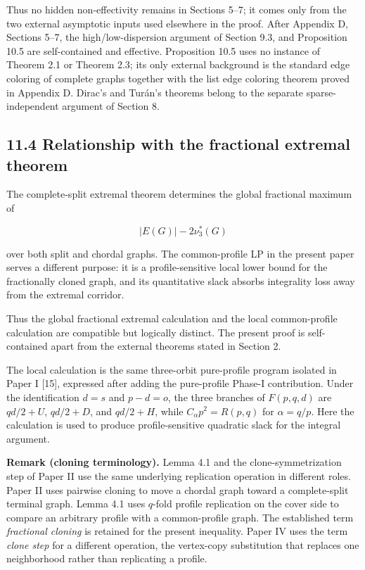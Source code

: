 \documentclass[english,11pt,a4paper]{article}
\begin{document}
Thus no hidden non-effectivity remains in Sections 5--7; it comes only
from the two external asymptotic inputs used elsewhere in the proof.
After Appendix D, Sections 5--7, the high/low-dispersion argument of
Section 9.3, and Proposition 10.5 are self-contained and effective.
Proposition 10.5 uses no instance of Theorem 2.1 or Theorem 2.3; its
only external background is the standard edge coloring of complete
graphs together with the list edge coloring theorem proved in Appendix
D. Dirac's and Turán's theorems belong to the separate
sparse-independent argument of Section 8.

\subsection{11.4 Relationship with the fractional extremal
theorem}\label{relationship-with-the-fractional-extremal-theorem}

The complete-split extremal theorem determines the global fractional
maximum of

\[
|E(G)|-2\nu_3^*(G)
\]

over both split and chordal graphs. The common-profile LP in the present
paper serves a different purpose: it is a profile-sensitive local lower
bound for the fractionally cloned graph, and its quantitative slack
absorbs integrality loss away from the extremal corridor.

Thus the global fractional extremal calculation and the local
common-profile calculation are compatible but logically distinct. The
present proof is self-contained apart from the external theorems stated
in Section 2.

The local calculation is the same three-orbit pure-profile program
isolated in Paper I {[}15{]}, expressed after adding the pure-profile
Phase-I contribution. Under the identification \(d=s\) and \(p-d=o\),
the three branches of \(F(p,q,d)\) are \(qd/2+U\), \(qd/2+D\), and
\(qd/2+H\), while \(C_\alpha p^2=R(p,q)\) for \(\alpha=q/p\). Here the
calculation is used to produce profile-sensitive quadratic slack for the
integral argument.

\textbf{Remark (cloning terminology).} Lemma 4.1 and the
clone-symmetrization step of Paper II use the same underlying
replication operation in different roles. Paper II uses pairwise cloning
to move a chordal graph toward a complete-split terminal graph. Lemma
4.1 uses \(q\)-fold profile replication on the cover side to compare an
arbitrary profile with a common-profile graph. The established term
\emph{fractional cloning} is retained for the present inequality. Paper
IV uses the term \emph{clone step} for a different operation, the
vertex-copy substitution that replaces one neighborhood rather than
replicating a profile.
\end{document}
